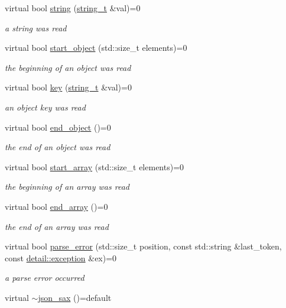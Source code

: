 \begin{DoxyCompactItemize}
virtual bool \mbox{\hyperlink{structnlohmann_1_1json__sax_a07eab82f6c82d606787eee9ad73d2bda}{string}} (\mbox{\hyperlink{structnlohmann_1_1json__sax_ae01977a9f3c5b3667b7a2929ed91061e}{string\+\_\+t}} \&val)=0
\begin{DoxyCompactList}\small\item\em a string was read \end{DoxyCompactList}\item 
virtual bool \mbox{\hyperlink{structnlohmann_1_1json__sax_a0671528b0debb5a348169d61f0382a0f}{start\+\_\+object}} (std\+::size\+\_\+t elements)=0
\begin{DoxyCompactList}\small\item\em the beginning of an object was read \end{DoxyCompactList}\item 
virtual bool \mbox{\hyperlink{structnlohmann_1_1json__sax_a2e0c7ecd80b18d18a8cc76f71cfc2028}{key}} (\mbox{\hyperlink{structnlohmann_1_1json__sax_ae01977a9f3c5b3667b7a2929ed91061e}{string\+\_\+t}} \&val)=0
\begin{DoxyCompactList}\small\item\em an object key was read \end{DoxyCompactList}\item 
virtual bool \mbox{\hyperlink{structnlohmann_1_1json__sax_ad0c722d53ff97be700ccf6a9468bd456}{end\+\_\+object}} ()=0
\begin{DoxyCompactList}\small\item\em the end of an object was read \end{DoxyCompactList}\item 
virtual bool \mbox{\hyperlink{structnlohmann_1_1json__sax_a5c53878cf08d463eb4e7ca0270532572}{start\+\_\+array}} (std\+::size\+\_\+t elements)=0
\begin{DoxyCompactList}\small\item\em the beginning of an array was read \end{DoxyCompactList}\item 
virtual bool \mbox{\hyperlink{structnlohmann_1_1json__sax_a235ee975617f28e6a996d1e36a282312}{end\+\_\+array}} ()=0
\begin{DoxyCompactList}\small\item\em the end of an array was read \end{DoxyCompactList}\item 
virtual bool \mbox{\hyperlink{structnlohmann_1_1json__sax_a60287e3bd85f489e04c83f7e3b76e613}{parse\+\_\+error}} (std\+::size\+\_\+t position, const std\+::string \&last\+\_\+token, const \mbox{\hyperlink{classnlohmann_1_1detail_1_1exception}{detail\+::exception}} \&ex)=0
\begin{DoxyCompactList}\small\item\em a parse error occurred \end{DoxyCompactList}\item 
virtual \mbox{\hyperlink{structnlohmann_1_1json__sax_af31bacfa81aa7818d8639d1da65c8eb5}{$\sim$json\+\_\+sax}} ()=default
\end{DoxyCompactItemize}


